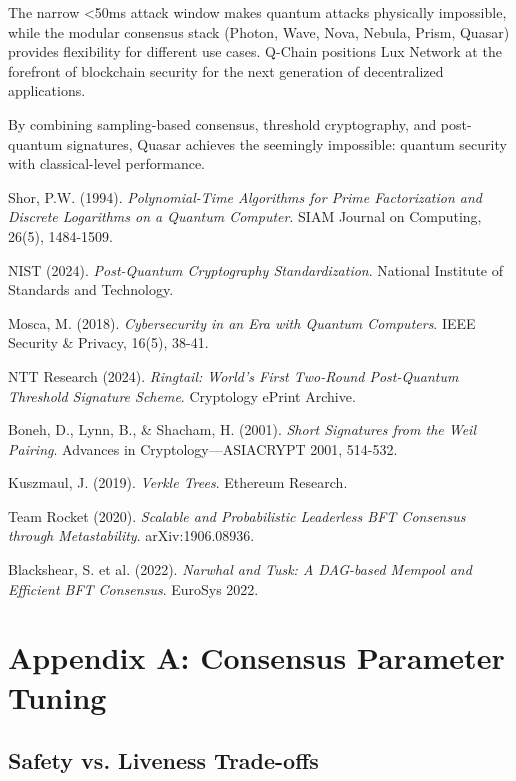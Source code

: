 \documentclass[11pt]{article}
\begin{document}
The narrow <50ms attack window makes quantum attacks physically impossible, while the modular consensus stack (Photon, Wave, Nova, Nebula, Prism, Quasar) provides flexibility for different use cases. Q-Chain positions Lux Network at the forefront of blockchain security for the next generation of decentralized applications.

By combining sampling-based consensus, threshold cryptography, and post-quantum signatures, Quasar achieves the seemingly impossible: quantum security with classical-level performance.

\begin{thebibliography}{99}

Shor, P.W. (1994).
\textit{Polynomial-Time Algorithms for Prime Factorization and Discrete Logarithms on a Quantum Computer}.
SIAM Journal on Computing, 26(5), 1484-1509.

NIST (2024).
\textit{Post-Quantum Cryptography Standardization}.
National Institute of Standards and Technology.

Mosca, M. (2018).
\textit{Cybersecurity in an Era with Quantum Computers}.
IEEE Security \& Privacy, 16(5), 38-41.

NTT Research (2024).
\textit{Ringtail: World's First Two-Round Post-Quantum Threshold Signature Scheme}.
Cryptology ePrint Archive.

Boneh, D., Lynn, B., \& Shacham, H. (2001).
\textit{Short Signatures from the Weil Pairing}.
Advances in Cryptology—ASIACRYPT 2001, 514-532.

Kuszmaul, J. (2019).
\textit{Verkle Trees}.
Ethereum Research.

Team Rocket (2020).
\textit{Scalable and Probabilistic Leaderless BFT Consensus through Metastability}.
arXiv:1906.08936.

Blackshear, S. et al. (2022).
\textit{Narwhal and Tusk: A DAG-based Mempool and Efficient BFT Consensus}.
EuroSys 2022.

\end{thebibliography}

\appendix

\section{Appendix A: Consensus Parameter Tuning}

\subsection{Safety vs. Liveness Trade-offs}
\end{document}
